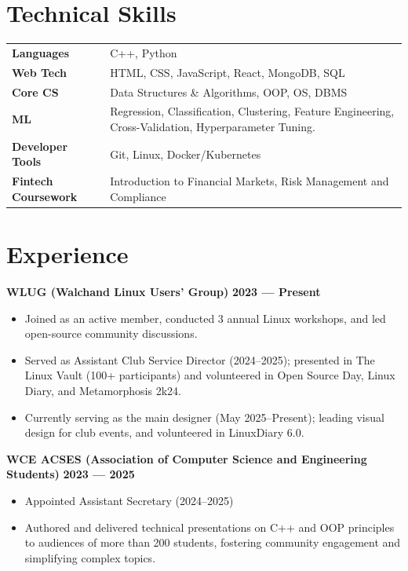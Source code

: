 \documentclass[a4paper, 8pt]{article}
\begin{document}
\section*{Technical Skills}
\begin{tabularx}{\textwidth}{@{}lX@{}}
    \textbf{Languages}    & C++, Python\\
    \textbf{Web Tech}      & HTML, CSS, JavaScript, React, MongoDB, SQL\\
    \textbf{Core CS}      & Data Structures \& Algorithms, OOP, OS, DBMS \\
    \textbf{ML}           & Regression, Classification, Clustering, Feature Engineering, Cross-Validation, Hyperparameter Tuning.\\
    \textbf{Developer Tools} & Git, Linux, Docker/Kubernetes \\
    \textbf{Fintech Coursework} & {Introduction to Financial Markets, Risk Management and Compliance} 
\end{tabularx}

\section*{Experience}
\textbf{WLUG (Walchand Linux Users' Group)} \hfill \textbf{2023 --- Present}
\begin{itemize}
    \item Joined as an active member, conducted 3 annual Linux workshops, and led open-source community discussions.
    \item Served as Assistant Club Service Director (2024–2025); presented in The Linux Vault (100+ participants) and volunteered in Open Source Day, Linux Diary, and Metamorphosis 2k24.
    \item Currently serving as the main designer (May 2025–Present); leading visual design for club events, and volunteered in LinuxDiary 6.0.
\end{itemize}

\textbf{WCE ACSES (Association of Computer Science and Engineering Students)} \hfill \textbf{2023 --- 2025}
\begin{itemize}
    \item Appointed Assistant Secretary (2024–2025)
     \item Authored and delivered technical presentations on C++ and OOP principles to audiences of more than 200 students, fostering community engagement and simplifying complex topics.
\end{itemize}
\end{document}
